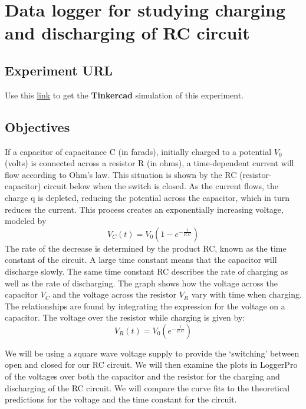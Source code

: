 \pagebreak\section{Data logger for studying charging and discharging of RC circuit}

\subsection{Experiment URL}
    Use this \href{https://www.tinkercad.com/things/awg0vQADVPP?sharecode=lBK08ktzr9HdJWinGq0Pj3PSK_MzsvQ5bzUg1wqTPac}{link} to get the \textbf{Tinkercad} simulation of this experiment.
    
\subsection{Objectives}
If a capacitor of capacitance C (in farads), initially charged to a potential $V_0$ (volts) is connected across a resistor R (in ohms), a time-dependent current will flow according to Ohm’s law. This situation is shown by the RC (resistor-capacitor) circuit below when the switch is closed.  As the current flows, the charge q is depleted, reducing the potential across the capacitor, which in turn reduces the current. This process creates an exponentially increasing voltage, modeled by
    \begin{equation}
        V_C(t)=V_0(1−e^{-\frac{t}{R.C}})
    \end{equation} 
The rate of the decrease is determined by the product RC, known as the time constant of the circuit. A large time constant means that the capacitor will discharge slowly.  The same time constant RC describes the rate of charging as well as the rate of discharging. The graph shows how the voltage across the capacitor $V_C$ and the voltage across the resistor $V_R$ vary with time when charging. The relationships are found by integrating the expression for the voltage on a capacitor. The voltage over the resistor while charging is given by:                                  
    \begin{equation}
        V_R(t)=V_0(e^{-\frac{t}{R.C}})
    \end{equation} 

We will be using a square wave voltage supply to provide the ‘switching’ between open and closed for our RC circuit. We will then examine the plots in LoggerPro of the voltages over both the capacitor and the resistor for the charging and discharging of the RC circuit. We will compare the curve fits to the theoretical predictions for the voltage and the time constant for the circuit.

